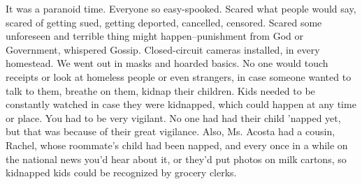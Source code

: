 It was a paranoid time. Everyone so easy-spooked. Scared what people would say, scared of getting sued, getting deported, cancelled, censored. Scared some unforeseen and terrible thing might happen--punishment from God or Government, whispered Gossip. Closed-circuit cameras installed, in every homestead. We went out in masks and hoarded basics. No one would touch receipts or look at homeless people or even strangers, in case someone wanted to talk to them, breathe on them, kidnap their children. Kids needed to be constantly watched in case they were kidnapped, which could happen at any time or place. You had to be very vigilant. No one had had their child 'napped yet, but that was because of their great vigilance. Also, Ms. Acosta had a cousin, Rachel, whose roommate's child had been napped, and every once in a while on the national news you'd hear about it, or they'd put photos on milk cartons, so kidnapped kids could be recognized by grocery clerks. 
